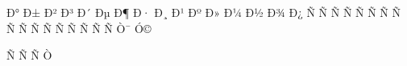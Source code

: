 \mubyte \cyra     ^^d0^^b0\endmubyte %
\mubyte \cyrb     ^^d0^^b1\endmubyte %
\mubyte \cyrv     ^^d0^^b2\endmubyte %
\mubyte \cyrg     ^^d0^^b3\endmubyte %
\mubyte \cyrd     ^^d0^^b4\endmubyte %
\mubyte \cyre     ^^d0^^b5\endmubyte %
\mubyte \cyrzh    ^^d0^^b6\endmubyte %
\mubyte \cyrz     ^^d0^^b7\endmubyte %
\mubyte \cyri     ^^d0^^b8\endmubyte %
\mubyte \cyrishrt ^^d0^^b9\endmubyte %
\mubyte \cyrk     ^^d0^^ba\endmubyte %
\mubyte \cyrl     ^^d0^^bb\endmubyte %
\mubyte \cyrm     ^^d0^^bc\endmubyte %
\mubyte \cyrn     ^^d0^^bd\endmubyte %
\mubyte \cyro     ^^d0^^be\endmubyte %
\mubyte \cyrp     ^^d0^^bf\endmubyte %
\mubyte \cyrr     ^^d1^^80\endmubyte %
\mubyte \cyrs     ^^d1^^81\endmubyte %
\mubyte \cyrt     ^^d1^^82\endmubyte %
\mubyte \cyru     ^^d1^^83\endmubyte %
\mubyte \cyrf     ^^d1^^84\endmubyte %
\mubyte \cyrh     ^^d1^^85\endmubyte %
\mubyte \cyrc     ^^d1^^86\endmubyte %
\mubyte \cyrch    ^^d1^^87\endmubyte %
\mubyte \cyrsh    ^^d1^^88\endmubyte %
\mubyte \cyrshch  ^^d1^^89\endmubyte %
\mubyte \cyrhrdsn ^^d1^^8a\endmubyte %
\mubyte \cyrery   ^^d1^^8b\endmubyte %
\mubyte \cyrsftsn ^^d1^^8c\endmubyte %
\mubyte \cyrerev  ^^d1^^8d\endmubyte %
\mubyte \cyryu    ^^d1^^8e\endmubyte %
\mubyte \cyrya    ^^d1^^8f\endmubyte %
\mubyte \cyryo    ^^d1^^91\endmubyte %
\mubyte \cyry     ^^d2^^af\endmubyte %
\mubyte \cyrotld  ^^d3^^a9\endmubyte %

\mubyte \cyrie    ^^d1^^94\endmubyte    %
\mubyte \cyrii    ^^d1^^96\endmubyte    %
\mubyte \cyryi    ^^d1^^97\endmubyte    %
\mubyte \cyrgup   ^^d2^^91\endmubyte    %

\endinput


This is a ``poor cyrillic'' used in 8bit TeX/pdfTeX with 8bit fonts. 
EncTeX have to be activated during format generation.

